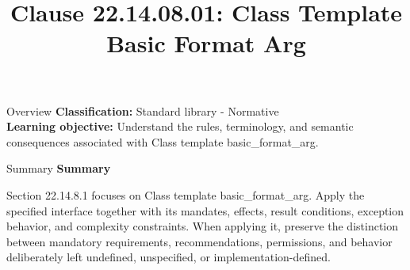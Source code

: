 \documentclass[10pt,letterpaper]{article}
\title{Clause 22.14.08.01: Class Template Basic Format Arg}
\author{}
\date{}
\begin{document}
\maketitle
\begin{CornellOverviewBox}{Overview}
\textbf{Classification:} Standard library - Normative\\[2pt]
\textbf{Learning objective:} Understand the rules, terminology, and semantic consequences associated with Class template basic\_format\_arg.
\end{CornellOverviewBox}\begin{CornellSummaryBox}{Summary}
{\sffamily\bfseries\color{Accent} Summary}\par\vspace{3pt}Section 22.14.8.1 focuses on Class template basic\_format\_arg. Apply the specified interface together with its mandates, effects, result conditions, exception behavior, and complexity constraints. When applying it, preserve the distinction between mandatory requirements, recommendations, permissions, and behavior deliberately left undefined, unspecified, or implementation-defined.
\end{CornellSummaryBox}
\end{document}
